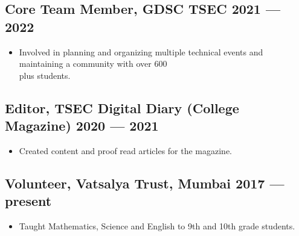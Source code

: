 \documentclass[10pt]{article}
\newenvironment{zitemize}{
\begin{itemize}\itemsep2pt \parskip0pt \parsep1pt}
{\end{itemize}\vspace{-0.7cm}}
\newcommand{\hskills}[1]{
\textbf{\bfseries #1} }
\begin{document}
\subsection*{Core Team Member, GDSC TSEC \hfill 2021 --- 2022} 
    \begin{zitemize}
            \item Involved in planning and organizing multiple technical events and maintaining a community with over 600 \\ plus students.
    \end{zitemize}

\subsection*{Editor, TSEC Digital Diary (College Magazine) \hfill 2020 --- 2021} 
    \begin{zitemize}
            \item Created content and proof read articles for the magazine.
    \end{zitemize}

\subsection*{Volunteer, Vatsalya Trust, Mumbai \hfill  2017 --- present} 
    \begin{zitemize}
            \item  Taught Mathematics, Science and English to 9th and 10th grade students.
    \end{zitemize}









\end{document}
